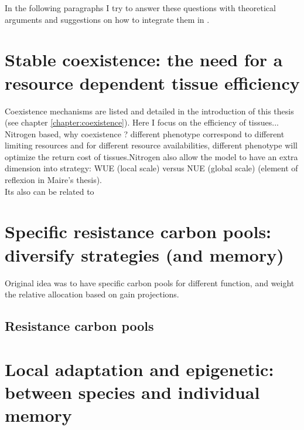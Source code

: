 In the following paragraphs I try to answer these questions with theoretical arguments and suggestions on how to integrate them in \model.

\section{Stable coexistence: the need for a resource dependent tissue efficiency}

Coexistence mechanisms are listed and detailed in the introduction of this thesis (see chapter \ref{chapter:coexistence}). Here I focus on the efficiency of tissues... Nitrogen based, why coexistence ? different phenotype correspond to different limiting resources and for different resource availabilities, different phenotype will optimize the return cost of tissues.Nitrogen also allow the model to have an extra dimension into strategy: WUE (local scale) versus NUE (global scale) (element of reflexion in Maire's thesis).\\
Its also can be related to


\section{Specific resistance carbon pools: diversify strategies (and memory)}

Original idea was to have specific carbon pools for different function, and weight the relative allocation based on gain projections.\\

\subsection{Resistance carbon pools}

%
%
%
%
%


\section{Local adaptation and epigenetic: between species and individual memory}




